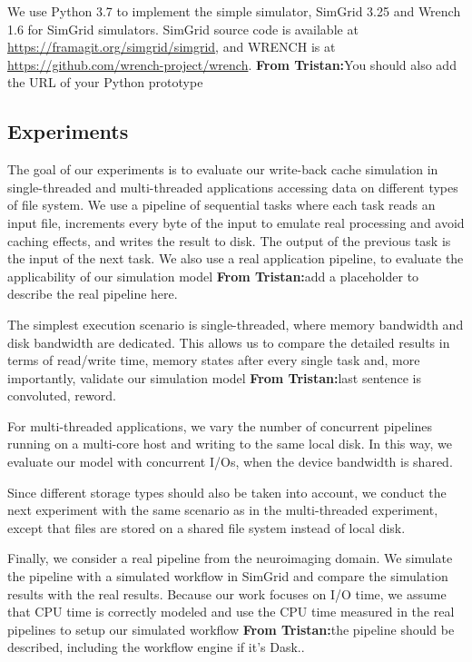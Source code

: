 \documentclass[conference]{IEEEtran}
\newcommand{\tristan}[1]{\color{orange}\textbf{From Tristan:}#1\color{black}}
\begin{document}
			We use Python 3.7 to implement the simple simulator, SimGrid 3.25
			and Wrench 1.6 for SimGrid simulators. SimGrid source code is
			available at \url{https://framagit.org/simgrid/simgrid}, and WRENCH
			is at \url{https://github.com/wrench-project/wrench}.
			\tristan{You should also add the URL of your Python prototype}
			
		\subsection{Experiments}
		
			The goal of our experiments is to evaluate our write-back cache
			simulation in single-threaded and multi-threaded applications
			accessing data on different types of file system. We use a pipeline
			of sequential tasks where each task reads an input file, increments
			every byte of the input to emulate real processing and avoid caching
			effects, and writes the result to disk. The output of the previous
			task is the input of the next task. We also use a real application pipeline, to evaluate the applicability of our
			simulation model \tristan{add a placeholder to describe the real pipeline here}.
			
			The simplest execution scenario is single-threaded, where memory 
			bandwidth and disk bandwidth are dedicated. 
			This allows us to compare the detailed results in terms of read/write time, 
			memory states after every single task and, more importantly, validate our 
			simulation model \tristan{last sentence is convoluted, reword}. 
			
			For multi-threaded applications, we vary the number of concurrent
			pipelines running on a multi-core host and writing to the same local
			disk. In this way, we evaluate our model with concurrent I/Os, when
			the device bandwidth is shared.
			
		    Since different storage types should also be taken into account, 
		    we conduct the next experiment with the same scenario as 
		    in the multi-threaded experiment, except that files are stored on a 
		    shared file system instead of local disk. 
		    
		    Finally, we consider a real pipeline from the neuroimaging domain. 
		    We simulate the pipeline with a simulated workflow in SimGrid 
			and compare the simulation results with the real results. 
			Because our work focuses on I/O time, we assume that CPU time is 
			correctly modeled and use the CPU time measured in the real pipelines 
			to setup our simulated workflow \tristan{the pipeline should be described, including the workflow engine if it's Dask.}. 
			
\end{document}
